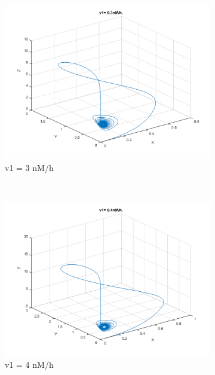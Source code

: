 \documentclass[10pt,a4paper,oneside,twocolumn]{article}
\numberwithin{equation}{section} %
\begin{document}
\begin{figure}
	\begin{subfigure}[b]{0.32\textwidth}
	    \includegraphics[width=\textwidth]{LotsofthesameA/A-AA3.png}
	    \caption{v1 = 3 nM/h}
	\end{subfigure}
	~ 
	\begin{subfigure}[b]{0.32\textwidth}
	    \includegraphics[width=\textwidth]{LotsofthesameA/A-AA4.png}
	    \caption{v1 = 4 nM/h}
	\end{subfigure}
	~
	\begin{subfigure}[b]{0.32\textwidth}

\end{subfigure}
\end{figure}
\end{document}
